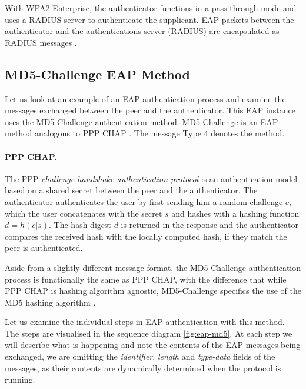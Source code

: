 With WPA2-Enterprise, the authenticator functions in a pass-through mode and uses a RADIUS server to authenticate the supplicant.
EAP packets between the authenticator and the authentications server (RADIUS) are encapsulated as RADIUS messages \cite{aboba2003radius, chen2005extensible, congdon2003ieee}.

\subsection{MD5-Challenge EAP Method}
Let us look at an example of an EAP authentication process and examine the messages exchanged between the peer and the authenticator. This EAP instance uses the MD5-Challenge authentication method.
MD5-Challenge is an EAP method analogous to PPP CHAP \cite{simpson1996ppp}. The message Type 4 denotes the method.

\paragraph{PPP CHAP.}
The PPP \textit{challenge handshake authentication protocol} is an authentication model based on a shared secret between the peer and the authenticator.
The authenticator authenticates the user by first sending him a random challenge $c$, which the user concatenates with the secret $s$ and hashes with a hashing function $d = h(c | s)$.
The hash digest $d$ is returned in the response and the authenticator compares the received hash with the locally computed hash, if they match the peer is authenticated.

Aside from a slightly different message format, the MD5-Challenge authentication process is functionally the same as PPP CHAP, with the difference that while PPP CHAP is hashing algorithm agnostic, MD5-Challenge specifics the use of the MD5 hashing algorithm \cite{rivest1992md5}.

\bigskip
\noindent
Let us examine the individual steps in EAP authentication with this method. 
The steps are visualised in the sequence diagram \ref{fig:eap-md5}.
At each step we will describe what is happening and note the contents of the EAP messages being exchanged, we are omitting the \textit{identifier}, \textit{length} and \textit{type-data} fields of the messages, as their contents are dynamically determined when the protocol is running.

